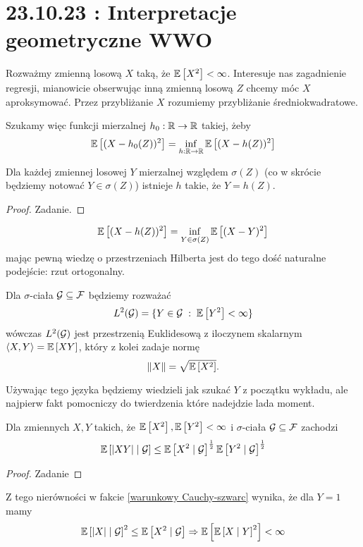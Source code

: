 \section{23.10.23 : Interpretacje geometryczne WWO}

Rozważmy zmienną losową $X$ taką, że $\expected{X^2}<\infty$. Interesuje nas zagadnienie regresji, mianowicie obserwując inną zmienną losową $Z$ chcemy móc $X$ aproksymować. Przez przybliżanie $X$ rozumiemy przybliżanie średniokwadratowe. 

Szukamy więc funkcji mierzalnej $h_0:\operatorname{\mathbb{R}}\to\operatorname{\mathbb{R}}$ takiej, żeby 
$$\expected{(X-h_0(Z))^2}=\inf_{h:\R\to\R}\expected{(X-h(Z))^2}$$

\begin{fact}\label{fakt 3.1}
  Dla każdej zmiennej losowej $Y$ mierzalnej względem $\sigma(Z)$ (co w skrócie będziemy notować $Y\in\sigma(Z)$) istnieje $h$ takie, że $Y=h(Z)$.
\end{fact}

\begin{proof}
  Zadanie.
\end{proof}

$$\expected{(X-h(Z))^2}=\inf_{Y\in\sigma(Z)}\expected{(X-Y)^2}$$
mając pewną wiedzę o przestrzeniach Hilberta jest do tego dość naturalne podejście: rzut ortogonalny.

Dla $\sigma$-ciała $\mathcal{G}\subseteq\mathcal{F}$ będziemy rozważać
$$L^2(\set{G})=\{Y\in\set{G}\;:\;\expected{Y^2}<\infty\}$$
wówczas $L^2(\mathcal{G})$ jest przestrzenią Euklidesową z iloczynem skalarnym $\langle X, Y\rangle=\expected{XY}$, który z kolei zadaje normę
$$\|X\|=\sqrt{\expected{X^2}}.$$

Używając tego języka będziemy wiedzieli jak szukać $Y$ z początku wykładu, ale najpierw fakt pomocniczy do twierdzenia które nadejdzie lada moment.

\begin{fact}\label{warunkowy Cauchy-szwarc}
  Dla zmiennych  $X,Y$ takich, że $\expected{X^2},\expected{Y^2}<\infty$ i $\sigma$-ciała $\mathcal{G}\subseteq\mathcal{F}$ zachodzi
  $$\expected{|XY|}{\set{G}}\leq\expected{X^2}{\set{G}}^{\frac{1}{2}}\expected{Y^2}{\set{G}}^{\frac{1}{2}}$$
\end{fact}

\begin{proof}
  Zadanie
\end{proof}

Z tego nierówności w fakcie \ref{warunkowy Cauchy-szwarc} wynika, że dla $Y=1$ mamy
$$\expected{|X|}{\set{G}}^2\leq\expected{X^2}{\set{G}}\implies\expected{\expected{X}{Y}^2}<\infty$$

